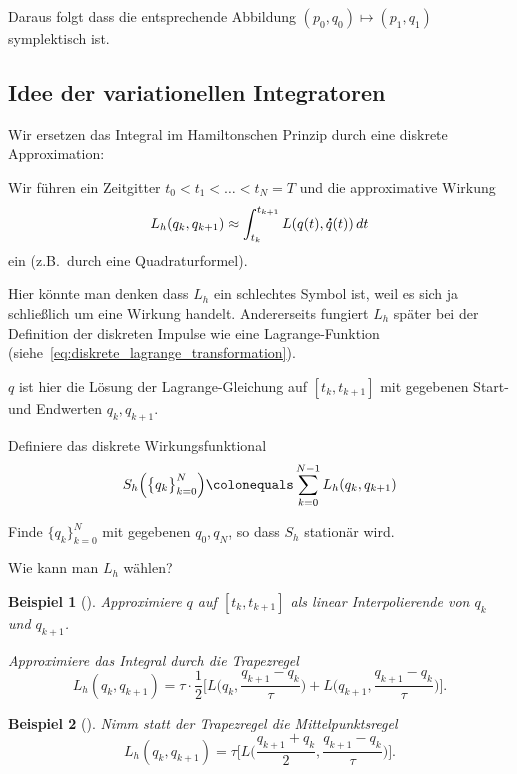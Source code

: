 \documentclass[german]{scrreprt}
\theoremstyle{plain}
\theoremstyle{nonumberplain}
\theoremstyle{nonumberplain}
\newtheorem{bsp}{Beispiel}
\theoremstyle{nonumberplain}
\renewcommand*{\dot}[1]{\accentset{\mbox{\large\bfseries .}}{#1}}
\begin{document}
Daraus folgt dass die entsprechende Abbildung $(p_0,q_0) \mapsto (p_1,q_1)$ symplektisch ist.

\subsection{Idee der variationellen Integratoren}

Wir ersetzen das Integral im Hamiltonschen Prinzip durch eine diskrete Approximation:

Wir führen ein Zeitgitter $t_0<t_1<\hdots < t_N = T$ und die approximative Wirkung
\begin{equation*}
L_h(q_k,q_{k+1})\approx \int_{t_k}^{t_{k+1}} L(q(t),\dot q(t))\,dt
\end{equation*}
ein (z.B.\ durch eine Quadraturformel).

Hier könnte man denken dass $L_h$ ein schlechtes Symbol ist, weil es sich ja schließlich um eine Wirkung handelt. Andererseits fungiert $L_h$ später bei der Definition der diskreten Impulse wie eine Lagrange-Funktion (siehe~\eqref{eq:diskrete_lagrange_transformation}).

$q$ ist hier die Lösung der Lagrange-Gleichung auf $[t_k,t_{k+1}]$ mit gegebenen Start- und Endwerten $q_k,q_{k+1}$.

Definiere das diskrete Wirkungsfunktional
\begin{equation*}
S_h\Big(\big\{q_k\big\}_{k=0}^N\Big) \colonequals \sum_{k=0}^{N-1} L_h(q_k,q_{k+1})
\end{equation*}

\begin{definition}
	Finde $\{q_k\}^N_{k=0}$  mit gegebenen $q_0, q_N$, so dass $S_h$ stationär wird.
\end{definition}

Wie kann man $L_h$ wählen?

\begin{bsp}[{{\cite[1992]{mackay:1992}}}]
	Approximiere $q$ auf $[t_k, t_{k+1}]$ als linear Interpolierende von $q_k$ und $q_{k+1}$.
	
	Approximiere das Integral durch die Trapezregel
	\begin{equation*}
	L_h(q_k, q_{k+1}) =
	\tau \cdot \frac{1}{2} \Big[L\Big(q_k, \frac{q_{k+1} - q_k}{\tau}\Big) +  L\Big(q_{k+1}, \frac{q_{k+1} - q_k}{\tau}\Big)\Big].
	\end{equation*}
\end{bsp}

\begin{bsp}[{{\cite[1997]{wendlandt_marsden:1997}}}]
	Nimm statt der Trapezregel die Mittelpunktsregel
	\begin{equation*}
	L_h(q_k, q_{k+1}) = \tau \Big[L\Big(\frac{q_{k+1} + q_k}{2}, \frac{q_{k+1} - q_k}{\tau}\Big)\Big].
	\end{equation*}
\end{bsp}
\end{document}
